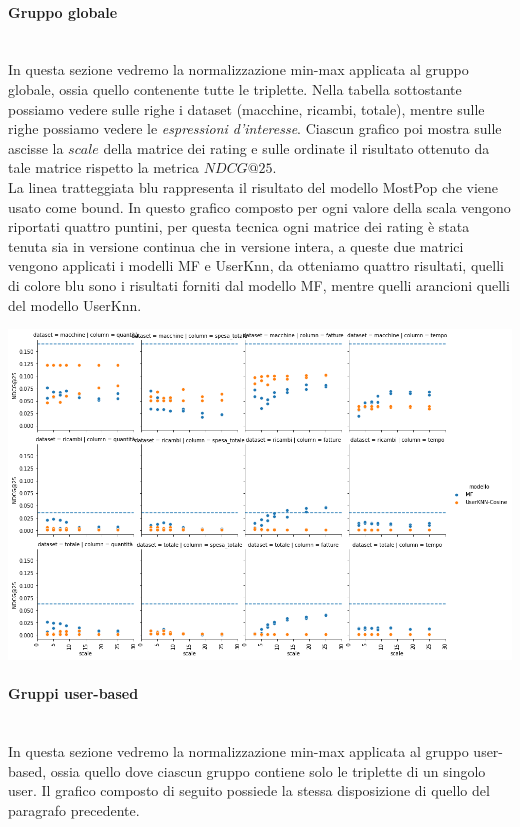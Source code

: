 \paragraph{Gruppo globale}\mbox{} \\
In questa sezione vedremo la normalizzazione min-max applicata al gruppo globale, ossia quello contenente tutte le triplette.
Nella tabella sottostante possiamo vedere sulle righe i dataset (macchine, ricambi, totale), mentre sulle righe possiamo vedere le \textit{espressioni d'interesse}. Ciascun grafico poi mostra sulle ascisse la $scale$ della matrice dei rating e sulle ordinate il risultato ottenuto da tale matrice rispetto la metrica $NDCG@25$. \\
La linea tratteggiata blu rappresenta il risultato del modello MostPop che viene usato come bound.
In questo grafico composto per ogni valore della scala vengono riportati quattro puntini, per questa tecnica ogni matrice dei rating è stata tenuta sia in versione continua che in versione intera, a queste due matrici vengono applicati i modelli MF e UserKnn, da otteniamo quattro risultati, quelli di colore blu sono i risultati forniti dal modello MF, mentre quelli arancioni quelli del modello UserKnn.

\includegraphics[width=16cm]{figures/risultati_minmax_globale.png}

\paragraph{Gruppi user-based}\mbox{} \\
In questa sezione vedremo la normalizzazione min-max applicata al gruppo user-based, ossia quello dove ciascun gruppo contiene solo le triplette di un singolo user. Il grafico composto di seguito possiede la stessa disposizione di quello del paragrafo precedente.

